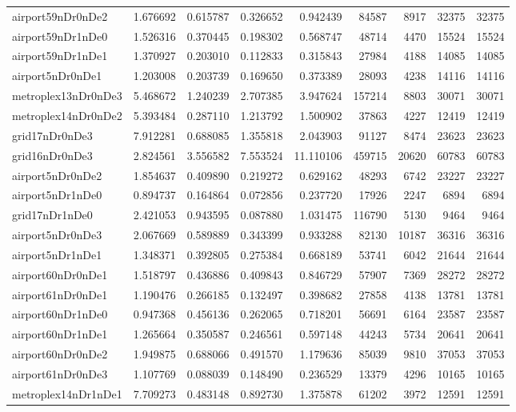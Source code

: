 \begin{longtable}{|l|r|r|r|r|r|r|r|r|}
airport59nDr0nDe2 & 1.676692 & 0.615787 & 0.326652 & 0.942439 & 84587 & 8917 & 32375 & 32375 \\
airport59nDr1nDe0 & 1.526316 & 0.370445 & 0.198302 & 0.568747 & 48714 & 4470 & 15524 & 15524 \\
airport59nDr1nDe1 & 1.370927 & 0.203010 & 0.112833 & 0.315843 & 27984 & 4188 & 14085 & 14085 \\
airport5nDr0nDe1 & 1.203008 & 0.203739 & 0.169650 & 0.373389 & 28093 & 4238 & 14116 & 14116 \\
metroplex13nDr0nDe3 & 5.468672 & 1.240239 & 2.707385 & 3.947624 & 157214 & 8803 & 30071 & 30071 \\
metroplex14nDr0nDe2 & 5.393484 & 0.287110 & 1.213792 & 1.500902 & 37863 & 4227 & 12419 & 12419 \\
grid17nDr0nDe3 & 7.912281 & 0.688085 & 1.355818 & 2.043903 & 91127 & 8474 & 23623 & 23623 \\
grid16nDr0nDe3 & 2.824561 & 3.556582 & 7.553524 & 11.110106 & 459715 & 20620 & 60783 & 60783 \\
airport5nDr0nDe2 & 1.854637 & 0.409890 & 0.219272 & 0.629162 & 48293 & 6742 & 23227 & 23227 \\
airport5nDr1nDe0 & 0.894737 & 0.164864 & 0.072856 & 0.237720 & 17926 & 2247 & 6894 & 6894 \\
grid17nDr1nDe0 & 2.421053 & 0.943595 & 0.087880 & 1.031475 & 116790 & 5130 & 9464 & 9464 \\
airport5nDr0nDe3 & 2.067669 & 0.589889 & 0.343399 & 0.933288 & 82130 & 10187 & 36316 & 36316 \\
airport5nDr1nDe1 & 1.348371 & 0.392805 & 0.275384 & 0.668189 & 53741 & 6042 & 21644 & 21644 \\
airport60nDr0nDe1 & 1.518797 & 0.436886 & 0.409843 & 0.846729 & 57907 & 7369 & 28272 & 28272 \\
airport61nDr0nDe1 & 1.190476 & 0.266185 & 0.132497 & 0.398682 & 27858 & 4138 & 13781 & 13781 \\
airport60nDr1nDe0 & 0.947368 & 0.456136 & 0.262065 & 0.718201 & 56691 & 6164 & 23587 & 23587 \\
airport60nDr1nDe1 & 1.265664 & 0.350587 & 0.246561 & 0.597148 & 44243 & 5734 & 20641 & 20641 \\
airport60nDr0nDe2 & 1.949875 & 0.688066 & 0.491570 & 1.179636 & 85039 & 9810 & 37053 & 37053 \\
airport61nDr0nDe3 & 1.107769 & 0.088039 & 0.148490 & 0.236529 & 13379 & 4296 & 10165 & 10165 \\
metroplex14nDr1nDe1 & 7.709273 & 0.483148 & 0.892730 & 1.375878 & 61202 & 3972 & 12591 & 12591 \\

\end{longtable}

